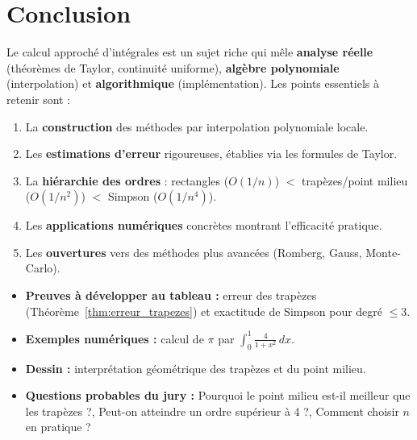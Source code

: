 \documentclass[a4paper,12pt]{article}
\theoremstyle{definition}
\theoremstyle{plain}
\theoremstyle{remark}
\begin{document}
\section*{Conclusion}

Le calcul approché d'intégrales est un sujet riche qui mêle \textbf{analyse réelle} (théorèmes de Taylor, continuité uniforme), \textbf{algèbre polynomiale} (interpolation) et \textbf{algorithmique} (implémentation). Les points essentiels à retenir sont :

\begin{enumerate}
  \item La \textbf{construction} des méthodes par interpolation polynomiale locale.
  \item Les \textbf{estimations d'erreur} rigoureuses, établies via les formules de Taylor.
  \item La \textbf{hiérarchie des ordres} : rectangles ($O(1/n)$) $<$ trapèzes/point milieu ($O(1/n^2)$) $<$ Simpson ($O(1/n^4)$).
  \item Les \textbf{applications numériques} concrètes montrant l'efficacité pratique.
  \item Les \textbf{ouvertures} vers des méthodes plus avancées (Romberg, Gauss, Monte-Carlo).
\end{enumerate}

\vspace{1em}
\begin{tcolorbox}[colback=green!5!white, colframe=green!50!black, title=Conseils pour l'oral]
\begin{itemize}
  \item \textbf{Preuves à développer au tableau :} erreur des trapèzes (Théorème~\ref{thm:erreur_trapezes}) et exactitude de Simpson pour degré $\leq 3$.
  \item \textbf{Exemples numériques :} calcul de $\pi$ par $\int_0^1 \frac{4}{1+x^2}\,dx$.
  \item \textbf{Dessin :} interprétation géométrique des trapèzes et du point milieu.
  \item \textbf{Questions probables du jury :} \og Pourquoi le point milieu est-il meilleur que les trapèzes ?\fg{}, \og Peut-on atteindre un ordre supérieur à 4 ?\fg{}, \og Comment choisir $n$ en pratique ?\fg{}
\end{itemize}
\end{tcolorbox}
\end{document}
